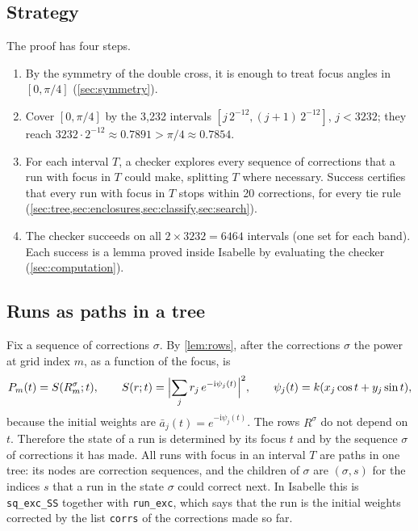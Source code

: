 \documentclass[11pt]{amsart}
\theoremstyle{plain}
\theoremstyle{definition}
\newcommand{\thy}[1]{\texttt{#1}}
\newcommand{\ab}{\bar a}
\begin{document}
\subsection{Strategy}

The proof has four steps.
\begin{enumerate}
\item By the symmetry of the double cross, it is enough to treat focus angles in $[0, \pi/4]$
(\cref{sec:symmetry}).
\item Cover $[0, \pi/4]$ by the 3{,}232 intervals $[j\,2^{-12}, (j+1)\,2^{-12}]$, $j < 3232$; they
reach $3232 \cdot 2^{-12} \approx 0.7891 > \pi/4 \approx 0.7854$.
\item For each interval $T$, a checker explores every sequence of corrections that a run with focus
in $T$ could make, splitting $T$ where necessary.  Success certifies that every run with focus in $T$
stops within 20 corrections, for every tie rule (\cref{sec:tree,sec:enclosures,sec:classify,sec:search}).
\item The checker succeeds on all $2 \times 3232 = 6464$ intervals (one set for each band).  Each
success is a lemma proved inside Isabelle by evaluating the checker (\cref{sec:computation}).
\end{enumerate}

\subsection{Runs as paths in a tree}\label{sec:tree}

Fix a sequence of corrections $\sigma$.  By \cref{lem:rows}, after the corrections $\sigma$ the power
at grid index $m$, as a function of the focus, is
\begin{equation}\label{eq:S}
P_m(t) = S(R^\sigma_m; t), \qquad S(r; t) = \Bigl|\sum_j r_j\, e^{-\mathrm{i}\psi_j(t)}\Bigr|^2, \qquad
\psi_j(t) = k(x_j \cos t + y_j \sin t),
\end{equation}
because the initial weights are $\ab_j(t) = e^{-\mathrm{i}\psi_j(t)}$.  The rows $R^\sigma$ do not depend
on $t$.  Therefore the state of a run is determined by its focus $t$ and by the sequence $\sigma$ of
corrections it has made.  All runs with focus in an interval $T$ are paths in one tree: its nodes
are correction sequences, and the children of $\sigma$ are $(\sigma, s)$ for the indices $s$ that a
run in the state $\sigma$ could correct next.  In Isabelle this is \thy{sq\_exc\_SS} together with
\thy{run\_exc}, which says that the run is the initial weights corrected by the list \thy{corrs} of
the corrections made so far.
\end{document}
